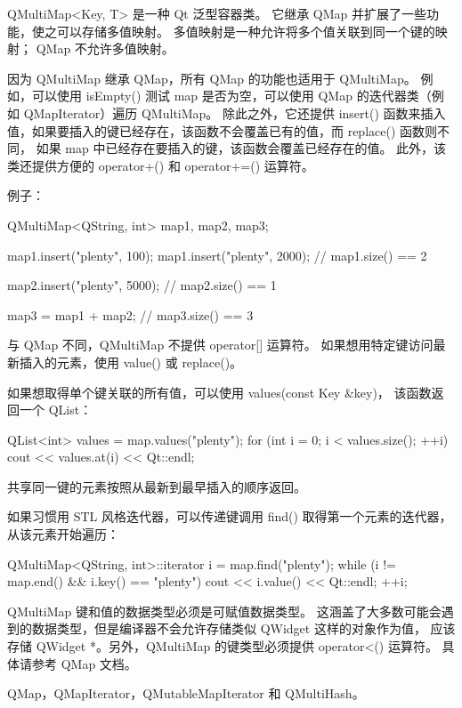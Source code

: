 QMultiMap<Key, T> 是一种 Qt 泛型容器类。
它继承 QMap 并扩展了一些功能，使之可以存储多值映射。
多值映射是一种允许将多个值关联到同一个键的映射；
QMap 不允许多值映射。

因为 QMultiMap 继承 QMap，所有 QMap 的功能也适用于 QMultiMap。
例如，可以使用 isEmpty() 测试 map 是否为空，可以使用 QMap 的迭代器类（例如 QMapIterator）遍历 QMultiMap。
除此之外，它还提供 insert() 函数来插入值，如果要插入的键已经存在，该函数不会覆盖已有的值，而 replace() 函数则不同，
如果 map 中已经存在要插入的键，该函数会覆盖已经存在的值。
此外，该类还提供方便的 operator+() 和 operator+=() 运算符。

例子：

\begin{cppcode}
QMultiMap<QString, int> map1, map2, map3;

map1.insert("plenty", 100);
map1.insert("plenty", 2000);
// map1.size() == 2

map2.insert("plenty", 5000);
// map2.size() == 1

map3 = map1 + map2;
// map3.size() == 3
\end{cppcode}


与 QMap 不同，QMultiMap 不提供 operator[] 运算符。
如果想用特定键访问最新插入的元素，使用 value() 或 replace()。

如果想取得单个键关联的所有值，可以使用 values(const Key \&key)，
该函数返回一个 QList：

\begin{cppcode}
QList<int> values = map.values("plenty");
for (int i = 0; i < values.size(); ++i)
    cout << values.at(i) << Qt::endl;
\end{cppcode}

共享同一键的元素按照从最新到最早插入的顺序返回。

如果习惯用 STL 风格迭代器，可以传递键调用 find() 取得第一个元素的迭代器，从该元素开始遍历：

\begin{cppcode}
QMultiMap<QString, int>::iterator i = map.find("plenty");
while (i != map.end() && i.key() == "plenty") {
    cout << i.value() << Qt::endl;
    ++i;
}
\end{cppcode}

QMultiMap 键和值的数据类型必须是可赋值数据类型。
这涵盖了大多数可能会遇到的数据类型，但是编译器不会允许存储类似 QWidget 这样的对象作为值，
应该存储 QWidget *。另外，QMultiMap 的键类型必须提供 operator<() 运算符。 
具体请参考 QMap 文档。

\begin{seeAlso}
QMap，QMapIterator，QMutableMapIterator 和 QMultiHash。
\end{seeAlso}

